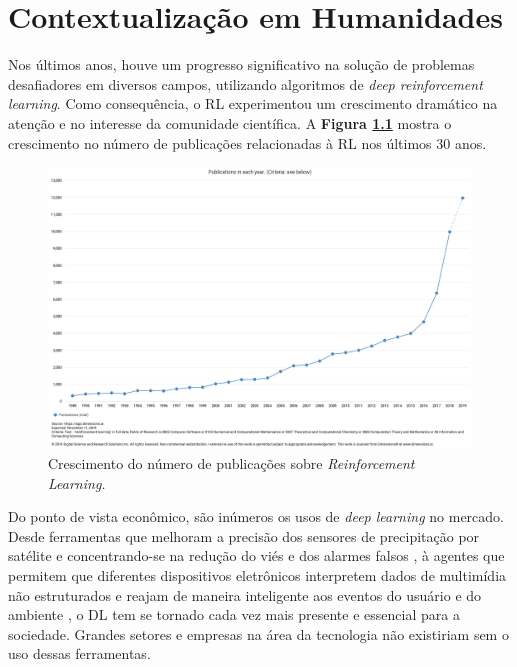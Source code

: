 \chapter{Contextualização em Humanidades}
\label{chap:ctx-hum}


Nos últimos anos, houve um progresso significativo na solução de problemas desafiadores em diversos campos, utilizando algoritmos de \textit{deep reinforcement learning}. Como consequência, o RL experimentou um crescimento dramático na atenção e no interesse da comunidade científica. A \textbf{Figura \ref{rl-publications-overview}} mostra o crescimento no número de publicações relacionadas à RL nos últimos 30 anos.

\begin{figure}[h]
  \centering
  \includegraphics[width=.7 \textwidth]{conteudo/imgs/rl-publications-overview.png}
  \caption[Crescimento do número de publicações sobre RL]{Crescimento do número de publicações sobre \textit{Reinforcement Learning.}}
  \label{rl-publications-overview}
 \end{figure}


Do ponto de vista econômico, são inúmeros os usos de \textit{deep learning} no mercado. Desde ferramentas que melhoram a precisão dos sensores de precipitação por satélite e concentrando-se na redução do viés e dos alarmes falsos \cite{doi:10.1175/JHM-D-15-0075.1}, à agentes que permitem que diferentes dispositivos eletrônicos interpretem dados de multimídia não estruturados e reajam de maneira inteligente aos eventos do usuário e do ambiente \cite{dl-IoT}, o DL tem se tornado cada vez mais presente e essencial para a sociedade. Grandes setores e empresas na área da tecnologia não existiriam sem o uso dessas ferramentas.

